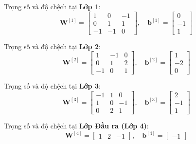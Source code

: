 Trọng số và độ chệch tại \textbf{Lớp 1}:
\begin{equation}
\mathbf{W}^{[1]} = 
\begin{bmatrix}
    1 & 0 & -1 \\
    0 & 1 & 1 \\
    -1 & -1 & 0
\end{bmatrix}, 
\quad
\mathbf{b}^{[1]} = 
\begin{bmatrix}
    0 \\ -1 \\ 1
\end{bmatrix}
\end{equation}

Trọng số và độ chệch tại \textbf{Lớp 2}:
\begin{equation}
\mathbf{W}^{[2]} = 
\begin{bmatrix}
    1 & -1 & 0 \\
    0 & 1 & 2 \\
    -1 & 0 & 1
\end{bmatrix}, 
\quad
\mathbf{b}^{[2]} = 
\begin{bmatrix}
    1 \\ -2 \\ 0
\end{bmatrix}
\end{equation}

Trọng số và độ chệch tại \textbf{Lớp 3}:
\begin{equation}
\mathbf{W}^{[3]} = 
\begin{bmatrix}
    -1 & 1 & 0 \\
    1 & 0 & -1 \\
    0 & 2 & 1
\end{bmatrix}, 
\quad
\mathbf{b}^{[3]} = 
\begin{bmatrix}
    2 \\ -1 \\ 1
\end{bmatrix}
\end{equation}

Trọng số và độ chệch tại \textbf{Lớp Đầu ra (Lớp 4)}:
\begin{equation}
\mathbf{W}^{[4]} = 
\begin{bmatrix}
    1 & 2 & -1
\end{bmatrix},
\quad
\mathbf{b}^{[4]} = 
\begin{bmatrix}
    -1
\end{bmatrix}
\end{equation}

